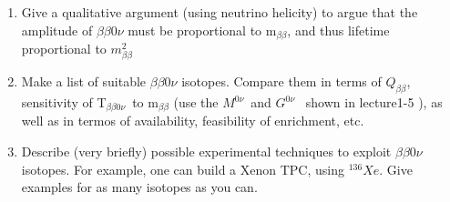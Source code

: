\begin{enumerate}
\item Give a qualitative argument (using neutrino helicity) to argue that the amplitude of  $\beta\beta0\nu$ must be proportional to m$_{\beta\beta}$, and thus lifetime proportional to $m_{\beta\beta}^2$
\item Make a list of suitable $\beta\beta0\nu$ isotopes. Compare them in terms of $Q_{\beta\beta}$, sensitivity of T$_{\beta\beta0\nu}$~to m$_{\beta\beta}$ (use the $M^{0\nu}$~and $G^{0\nu}$~ shown in lecture1-5 ), as well as in termos of availability, feasibility of enrichment, etc. 
\item Describe (very briefly) possible experimental techniques to exploit $\beta\beta0\nu$ isotopes. For example, one can build a Xenon TPC, using ${}^{136}Xe$. Give examples for as many isotopes as you can.  
\end{enumerate}
